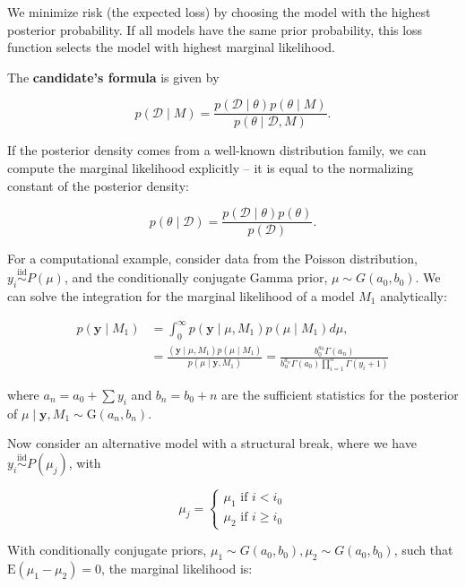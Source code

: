 We minimize risk (the expected loss) by choosing the model with the highest posterior probability. If all models have the same prior probability, this loss function selects the model with highest marginal likelihood.

The \textbf{candidate's formula} is given by 

\begin{equation}
	p(\mathcal{D}\mid M)  = \frac{p(\mathcal{D}\mid\theta)p(\theta \mid M)}{p(\theta\mid \mathcal{D}, M)}.
\end{equation}

If the posterior density comes from a well-known distribution family, we can compute the marginal likelihood explicitly -- it is equal to the normalizing constant of the posterior density:

\[
	p(\theta\mid\mathcal{D}) = \frac{p(\mathcal{D}\mid\theta)p(\theta)}{p(\mathcal{D})}.
\]


For a computational example, consider data from the Poisson distribution, $y_i \overset{\mathrm{iid}}{\sim} P(\mu)$, and the conditionally conjugate Gamma prior, $\mu \sim G\left(a_0, b_0\right)$. We can solve the integration for the marginal likelihood of a model $M_1$ analytically:

\begin{align*}
p\left(\bm{y} \mid M_1\right) & =\int_0^{\infty} p\left(\bm{y} \mid \mu, M_1\right) p\left(\mu \mid M_1\right) d \mu, \\
& =\frac{\left(\bm{y} \mid \mu, M_1\right) p\left(\mu \mid M_1\right)}{p\left(\mu \mid \bm{y}, M_1\right)}=\frac{b_0^{a_0} \Gamma\left(a_n\right)}{b_n^{a_n} \Gamma\left(a_0\right) \prod_{i=1}^n \Gamma\left(y_i+1\right)}
\end{align*}

where $a_n=a_0+\sum y_i$ and $b_n=b_0+n$ are the sufficient statistics for the posterior of $\mu \mid \bm{y}, M_1 \sim \mathrm{G}\left(a_n, b_n\right)$.

Now consider an alternative model with a structural break, where we have $y_i\overset{\mathrm{i i d}}{ \sim} {P}\left(\mu_j\right)$, with

\[
\mu_j=\left\{\begin{array}{l}
\mu_1 \text { if } i<i_0 \\
\mu_2 \text { if } i \geq i_0
\end{array}\right.
\]

With conditionally conjugate priors, $\mu_1 \sim G\left(a_0, b_0\right), \mu_2 \sim G\left(a_0, b_0\right)$, such that $\mathrm{E}\left(\mu_1-\mu_2\right)=0$, the marginal likelihood is:

